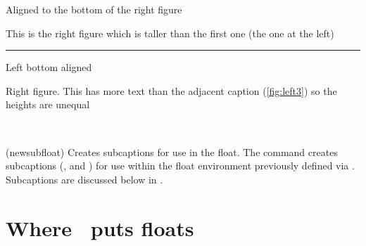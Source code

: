 \begin{shadefigure}
\hhrule \vspace{0.5\onelineskip}
\null\hfill\parbox[b]{0.45\linewidth}{%
  \centering
  Aligned to the bottom of the right figure
}\hfill
\parbox[b]{0.45\linewidth}{%
  \centering
   This is the right figure which is taller
   than the first one (the one at the left)
}\hfill\null
\vspace{0.5\onelineskip}\hrule
\null\hfill\parbox[t]{0.4\linewidth}{%
  \caption{Left bottom aligned}\label{fig:left3}%
}\hfill
\parbox[t]{0.4\linewidth}{%
  \caption{Right figure. This has more text than the adjacent
           caption (\ref{fig:left3}) so the heights are unequal}%
           \label{fig:right3}%
}\hfill\null
\hhrule
\end{shadefigure}


\begin{syntax}
 \cmd{\newsubfloat} \\
\end{syntax}
\glossary(newsubfloat)%
  {}%
  {Creates subcaptions for use in the  float.}
 The \cmd{\newsubfloat} command  
creates subcaptions
(\cmd{\subcaption}, \cmd{\subtop} and \cmd{\subbottom})
for use within the float environment  previously
defined via \cmd{\newfloat}. 
Subcaptions are discussed below in . 


 \section{Where \ltx\ puts floats} \label{sec:floatplace}


